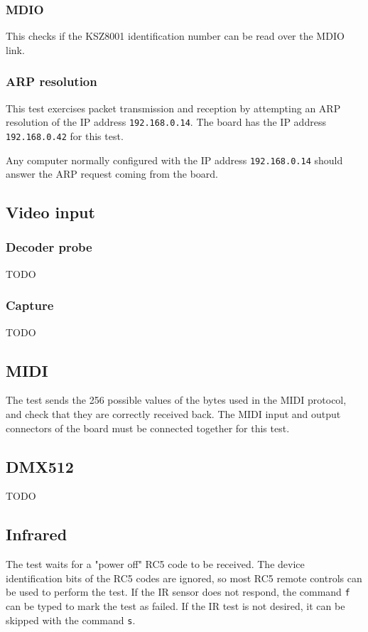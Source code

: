 \documentclass[a4paper,11pt]{article}
\begin{document}
\subsubsection{MDIO}
This checks if the KSZ8001 identification number can be read over the MDIO link.

\subsubsection{ARP resolution}
This test exercises packet transmission and reception by attempting an ARP resolution of the IP address \verb!192.168.0.14!. The board has the IP address \verb!192.168.0.42! for this test.

Any computer normally configured with the IP address \verb!192.168.0.14! should answer the ARP request coming from the board.

\subsection{Video input}
\subsubsection{Decoder probe}
TODO
\subsubsection{Capture}
TODO

\subsection{MIDI}
The test sends the 256 possible values of the bytes used in the MIDI protocol, and check that they are correctly received back. The MIDI input and output connectors of the board must be connected together for this test.

\subsection{DMX512}
TODO

\subsection{Infrared}
The test waits for a "power off" RC5 code to be received. The device identification bits of the RC5 codes are ignored, so most RC5 remote controls can be used to perform the test. If the IR sensor does not respond, the command \verb!f! can be typed to mark the test as failed. If the IR test is not desired, it can be skipped with the command \verb!s!.
\end{document}
